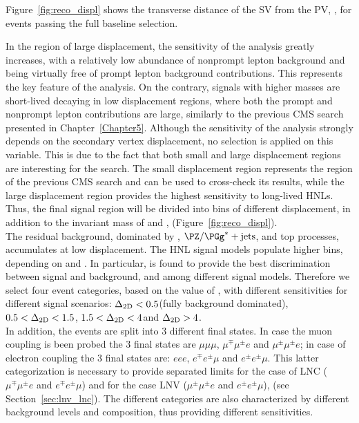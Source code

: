 Figure~\ref{fig:reco_displ} shows the transverse
distance of the SV from the PV, \Deltwod, for events
passing the full baseline selection.

In the region of large displacement, the sensitivity of the analysis
greatly increases, with a relatively low abundance of nonprompt lepton
background and being virtually free of prompt lepton background
contributions. This represents the key feature of the analysis.
On the contrary, signals with higher masses are short-lived \hnl
decaying in low displacement regions, where both the prompt and
nonprompt lepton contributions are large, similarly to the previous
CMS search presented in Chapter~\ref{Chapter5}.
Although the sensitivity of the analysis strongly depends on the
secondary vertex displacement, no selection is applied on this
variable. This is due to the fact that both small and large
displacement regions are interesting for the search. The small
displacement region represents the region of the previous CMS search
and can be used to cross-check its results, while the large
displacement region provides the highest sensitivity to long-lived
HNLs. 
Thus, the final signal region will be divided into bins of different
displacement, in addition to the invariant mass of \ltwo and \lthree,
\mtwol (Figure~\ref{fig:reco_displ}).\\

The residual background, dominated by \Xg,
$\PZ/\PGg^{\ast}+\mathrm{jets}$, and top processes, accumulates at low
displacement. The HNL signal models populate higher \Deltwod bins, depending on \mhnl and \mixpar. In particular, \Deltwod
is found to provide the best discrimination between signal and
background, and among different signal models.
Therefore we select four event categories, based on the value of
\Deltwod, with different sensitivities for different signal
scenarios:
$\Delta_{\mathrm{2D}}<0.5$\cm (fully background dominated), $0.5<\Delta_{\mathrm{2D}}<1.5$\cm,
$1.5<\Delta_{\mathrm{2D}}<4$\cm and $\Delta_{\mathrm{2D}}>4$\cm.\\
In addition, the events are split into 3 different final states. In case 
the muon coupling is been probed the 3 final states are $\mu\mu\mu$,  $\mu^{\mp}\mu^{\pm} e$ 
and $\mu^{\pm}\mu^{\pm}e$; in case of electron coupling the 3 final states
are: $eee$,  $e^{\mp}e^{\pm}\mu$ and $e^{\pm}e^{\pm}\mu$. This latter categorization
is necessary to provide separated limits for the case of LNC ($\mu^{\mp}\mu^{\pm} e$ and $e^{\mp}e^{\pm}\mu$)
and for the case LNV ($\mu^{\pm}\mu^{\pm} e$ and $e^{\pm}e^{\pm}\mu$), (see Section~\ref{sec:lnv_lnc}).
The different categories are also characterized by different
background levels and composition, thus providing different
sensitivities.

